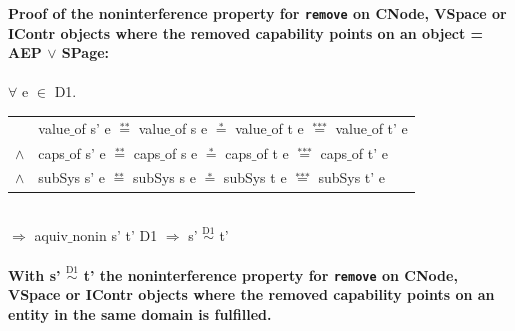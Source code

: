 \documentclass[11pt,a4paper,twoside]{article}
\begin{document}
{\begin{itemize}
\textbf{Proof of the noninterference property for \texttt{remove} on CNode, VSpace or IContr objects where the removed capability points on an object = AEP $\vee$ SPage:}\\ \\
$\forall$ e $\in$ D1. \\
\begin{tabular}{ll}
& value$\_$of s' e $\overset{\text{**}}{=}$ value$\_$of s e $\overset{\text{*}}{=}$ value$\_$of t e $\overset{\text{***}}{=}$ value$\_$of t' e \\
$\wedge$ & caps$\_$of s' e $\overset{\text{**}}{=}$ caps$\_$of s e $\overset{\text{*}}{=}$ caps$\_$of t e $\overset{\text{***}}{=}$ caps$\_$of t' e \\
$\wedge$ & subSys s' e $\overset{\text{**}}{=}$ subSys s e $\overset{\text{*}}{=}$ subSys t e $\overset{\text{***}}{=}$ subSys t' e
\end{tabular} \\
$\Rightarrow$ aquiv$\_$nonin s' t' D1 $\Rightarrow$ s' $\overset{\text{D1}}{\sim}$ t' \\ \\
\textbf{With s' $\overset{\text{D1}}{\sim}$ t' the noninterference property for \texttt{remove} on CNode, VSpace or IContr objects where the removed capability points on an entity in the same domain is fulfilled.}  
\clearpage
\end{itemize}
}
\end{document}
